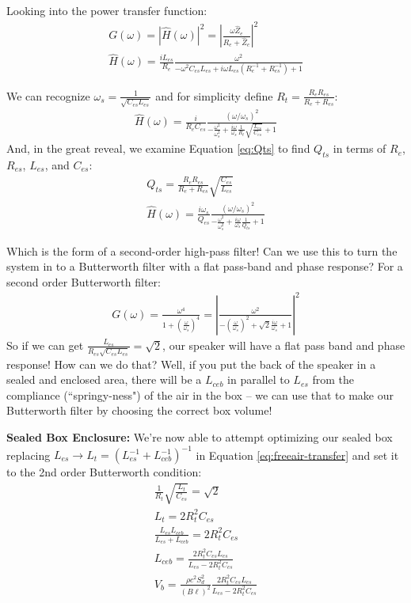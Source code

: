 \documentclass[10pt,letterpaper]{book}
\begin{document}
Looking into the power transfer function:
\begin{align}
G(\omega)=\left| \hat{H}(\omega)\right|^2 =\left| \frac{\omega  \hat{Z}_e }{ R_e+\hat{Z}_e} \right|^2\\
\hat{H}(\omega) =\frac{i L_{es}}{R_e}\frac{\omega^2}{-\omega^2 C_{es}L_{es}+i\omega L_{es}\left( R_e^{-1}+R_{es}^{-1} \right) +1}
\end{align}

We can recognize $\omega_s=\frac{1}{\sqrt{C_{es} L_{es}}}$ and for simplicity define $R_t=\frac{R_eR_{es}}{R_e+R_{es}}$:
\begin{align}
\hat{H}(\omega) =\frac{i }{R_eC_{es}}\frac{(\omega/\omega_s)^2}{-\frac{\omega^2}{\omega_s^2} +\frac{i \omega}{\omega_s}\frac{1}{R_t}\sqrt{\frac{ L_{es}}{C_{es}}} +1}\label{eq:freeair-transfer}
\end{align}
And, in the great reveal, we examine Equation \ref{eq:Qts} to find $Q_{ts}$ in terms of $R_{e}$, $R_{es}$, $L_{es}$, and $C_{es}$:
\begin{align}
Q_{ts}=\frac{R_e R_{es}}{R_e+R_{es}}\sqrt{\frac{C_{es}}{L_{es}}}\\
\hat{H}(\omega) =\frac{i \omega_s}{Q_{es}}\frac{(\omega/\omega_s)^2}{-\frac{\omega^2}{\omega_s^2} +\frac{i \omega}{\omega_s}\frac{1}{Q_{ts}}+1}
\end{align}

Which is the form of a second-order high-pass filter! Can we use this to turn the system in to a Butterworth filter with a flat pass-band and phase response? For a second order Butterworth filter:
\begin{align}
G(\omega)=\frac{\omega^4}{1+\left( \frac{\omega}{\omega_s} \right)^4}=\left| \frac{\omega^2}{-\left(\frac{\omega}{\omega_s} \right)^2 +\sqrt{2}\frac{i\omega}{\omega_s} +1} \right|^2
\end{align}
So if we can get $\frac{ L_{es}}{R_{es}\sqrt{C_{es}L_{es}}} =\sqrt{2}$, our speaker will have a flat pass band and phase response! How can we do that? Well, if you put the back of the speaker in a sealed and enclosed area, there will be a $L_{ceb}$ in parallel to $L_{es}$ from the compliance (``springy-ness") of the air in the box -- we can use that to make our Butterworth filter by choosing the correct box volume!

\textbf{Sealed Box Enclosure:} We're now able to attempt optimizing our sealed box replacing $L_{es}\rightarrow L_t=\left(L_{es}^{-1}+L_{ceb}^{-1}\right)^{-1}$ in Equation \ref{eq:freeair-transfer} and set it to the 2nd order Butterworth condition:
\begin{align}
\frac{ 1}{R_{t}}\sqrt{\frac{L_t}{C_{es}} } =\sqrt{2}\\
L_t=2R_{t}^2C_{es}\\
\frac{L_{es}L_{ceb}}{L_{es}+L_{ceb}}=2R_{t}^2C_{es}\\
L_{ceb}=\frac{2R_{t}^2C_{es}L_{es}}{L_{es}-2R_{t}^2C_{es}}\\
V_b=\frac{\rho c^2 S_d^2}{(B\ell)^2}\frac{2R_{t}^2C_{es}L_{es}}{L_{es}-2R_{t}^2C_{es}}
\end{align}
\end{document}
